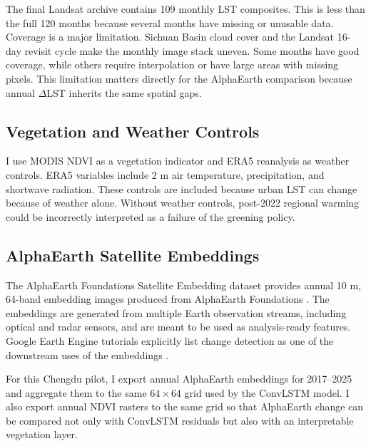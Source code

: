 \documentclass{article}
\begin{document}
The final Landsat archive contains 109 monthly LST composites. This is less
than the full 120 months because several months have missing or unusable data.
Coverage is a major limitation. Sichuan Basin cloud cover and the Landsat
16-day revisit cycle make the monthly image stack uneven. Some months have good
coverage, while others require interpolation or have large areas with missing
pixels. This limitation matters directly for the AlphaEarth comparison because
annual $\Delta$LST inherits the same spatial gaps.

\subsection{Vegetation and Weather Controls}

I use MODIS NDVI as a vegetation indicator and ERA5 reanalysis as weather
controls. ERA5 variables include 2 m air temperature, precipitation, and
shortwave radiation. These controls are included because urban LST can change
because of weather alone. Without weather controls, post-2022 regional warming
could be incorrectly interpreted as a failure of the greening policy.

\subsection{AlphaEarth Satellite Embeddings}

The AlphaEarth Foundations Satellite Embedding dataset provides annual 10 m,
64-band embedding images produced from AlphaEarth Foundations
\citep{Google2025Catalog}. The embeddings are generated from
multiple Earth observation streams, including optical and radar sensors, and
are meant to be used as analysis-ready features. Google Earth Engine tutorials
explicitly list change detection as one of the downstream uses of the embeddings
\citep{Google2025Tutorial}.

For this Chengdu pilot, I export annual AlphaEarth embeddings for 2017--2025
and aggregate them to the same $64 \times 64$ grid used by the ConvLSTM model.
I also export annual NDVI rasters to the same grid so that AlphaEarth change can
be compared not only with ConvLSTM residuals but also with an interpretable
vegetation layer.
\end{document}
